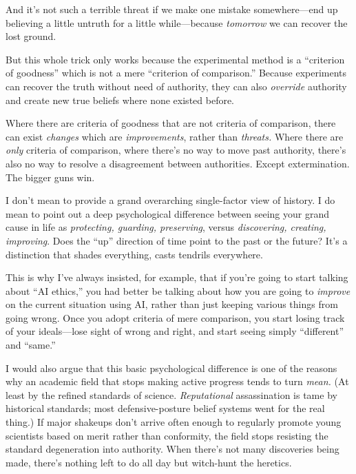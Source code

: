 {
 And it's not such a terrible threat if we make one
mistake somewhere---end up believing a little untruth for a little
while---because \textit{tomorrow} we can recover the lost ground.}

{
 But this whole trick only works because the experimental method is
a ``criterion of goodness'' which is
not a mere ``criterion of
comparison.'' Because experiments can recover the
truth without need of authority, they can also \textit{override}
authority and create new true beliefs where none existed before.}

{
 Where there are criteria of goodness that are not criteria of
comparison, there can exist \textit{changes} which are
\textit{improvements}, rather than \textit{threats.} Where there are
\textit{only} criteria of comparison, where there's no
way to move past authority, there's also no way to
resolve a disagreement between authorities. Except extermination. The
bigger guns win.}

{
 I don't mean to provide a grand overarching
single-factor view of history. I do mean to point out a deep
psychological difference between seeing your grand cause in life as
\textit{protecting, guarding, preserving}, versus \textit{discovering,
creating, improving}. Does the
``up'' direction of time point to
the past or the future? It's a distinction that shades
everything, casts tendrils everywhere.}

{
 This is why I've always insisted, for example,
that if you're going to start talking about
``AI ethics,'' you had better be
talking about how you are going to \textit{improve} on the current
situation using AI, rather than just keeping various things from going
wrong. Once you adopt criteria of mere comparison, you start losing
track of your ideals---lose sight of wrong and right, and start seeing
simply ``different'' and
``same.''}

{
 I would also argue that this basic psychological difference is one
of the reasons why an academic field that stops making active progress
tends to turn \textit{mean.} (At least by the refined standards of
science. \textit{Reputational} assassination is tame by historical
standards; most defensive-posture belief systems went for the real
thing.) If major shakeups don't arrive often enough to
regularly promote young scientists based on merit rather than
conformity, the field stops resisting the standard degeneration into
authority. When there's not many discoveries being
made, there's nothing left to do all day but witch-hunt
the heretics.}

